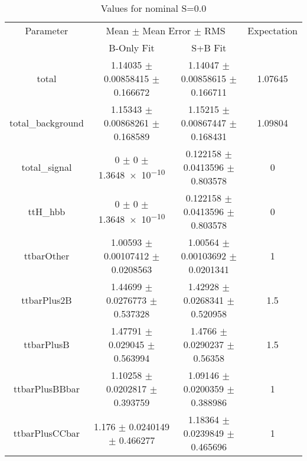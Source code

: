 \begin{table}
\centering
\caption{Values for nominal S=0.0}
\begin{tabular}{cccc}
\toprule
Parameter & \multicolumn{2}{c}{Mean $\pm$ Mean Error $\pm$ RMS} & Expectation\\
 & B-Only Fit & S+B Fit & \\
\midrule
total & \num{1.14035} $\pm$ \num{0.00858415} $\pm$ \num{0.166672} & \num{1.14047} $\pm$ \num{0.00858615} $\pm$ \num{0.166711} & \num{1.07645}\\
total\_background & \num{1.15343} $\pm$ \num{0.00868261} $\pm$ \num{0.168589} & \num{1.15215} $\pm$ \num{0.00867447} $\pm$ \num{0.168431} & \num{1.09804}\\
total\_signal & \num{0} $\pm$ \num{0} $\pm$ \num{1.3648e-10} & \num{0.122158} $\pm$ \num{0.0413596} $\pm$ \num{0.803578} & \num{0}\\
ttH\_hbb & \num{0} $\pm$ \num{0} $\pm$ \num{1.3648e-10} & \num{0.122158} $\pm$ \num{0.0413596} $\pm$ \num{0.803578} & \num{0}\\
ttbarOther & \num{1.00593} $\pm$ \num{0.00107412} $\pm$ \num{0.0208563} & \num{1.00564} $\pm$ \num{0.00103692} $\pm$ \num{0.0201341} & \num{1}\\
ttbarPlus2B & \num{1.44699} $\pm$ \num{0.0276773} $\pm$ \num{0.537328} & \num{1.42928} $\pm$ \num{0.0268341} $\pm$ \num{0.520958} & \num{1.5}\\
ttbarPlusB & \num{1.47791} $\pm$ \num{0.029045} $\pm$ \num{0.563994} & \num{1.4766} $\pm$ \num{0.0290237} $\pm$ \num{0.56358} & \num{1.5}\\
ttbarPlusBBbar & \num{1.10258} $\pm$ \num{0.0202817} $\pm$ \num{0.393759} & \num{1.09146} $\pm$ \num{0.0200359} $\pm$ \num{0.388986} & \num{1}\\
ttbarPlusCCbar & \num{1.176} $\pm$ \num{0.0240149} $\pm$ \num{0.466277} & \num{1.18364} $\pm$ \num{0.0239849} $\pm$ \num{0.465696} & \num{1}\\
\bottomrule
\end{tabular}
\end{table}